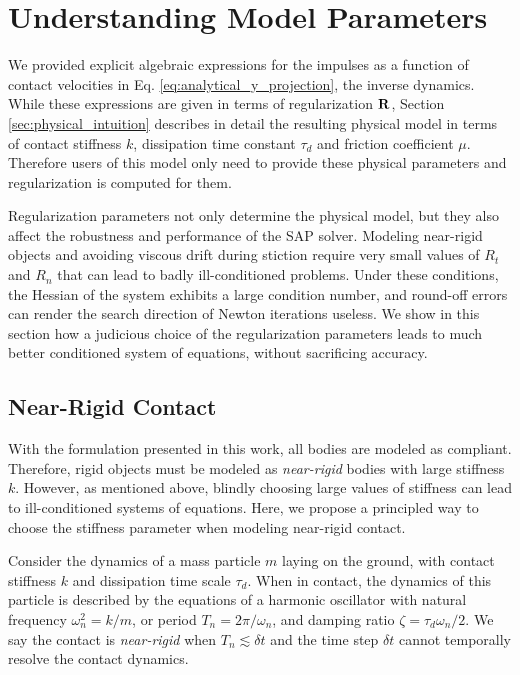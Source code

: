 \section{Understanding Model Parameters}
\label{sec:understanding_model_parameters}

We provided explicit algebraic expressions for the impulses as a function of
contact velocities in Eq. \eqref{eq:analytical_y_projection}, the inverse
dynamics. While these expressions are given in terms of regularization ${\mathbf{R}}$,
Section \ref{sec:physical_intuition} describes in detail the resulting physical
model in terms of contact stiffness $k$, dissipation time constant $\tau_d$ and
friction coefficient $\mu$. Therefore users of this model only need to provide
these physical parameters and regularization is computed for them.

Regularization parameters not only determine the physical model, but
they also affect the robustness and performance of the SAP solver. Modeling near-rigid
objects and avoiding viscous drift during stiction require very small values of
$R_t$ and $R_n$ that can lead to badly ill-conditioned problems. Under these
conditions, the Hessian of the system exhibits a large condition number, and
round-off errors can render the search direction of Newton iterations
useless. We show in this section how a judicious choice of the regularization
parameters leads to much better conditioned system of equations, without
sacrificing accuracy.

\subsection{Near-Rigid Contact}

With the formulation presented in this work, all bodies are modeled as compliant.
Therefore, rigid objects must be modeled as \emph{near-rigid} bodies with large
stiffness $k$. However, as mentioned above, blindly choosing large values of stiffness can
lead to ill-conditioned systems of equations. Here, we propose a principled way
to choose the stiffness parameter when modeling near-rigid contact.

Consider the dynamics of a mass particle $m$ laying on the ground, with contact
stiffness $k$ and dissipation time scale $\tau_d$. When in contact, the dynamics
of this particle is described by the equations of a harmonic oscillator with
natural frequency $\omega_n^2 = k/m$, or period $T_n = 2\pi/\omega_n$, and
damping ratio $\zeta=\tau_d\omega_n/2$. We say the contact is \emph{near-rigid}
when $T_n \lesssim \delta t$ and the time step $\delta t$ cannot temporally
resolve the contact dynamics. 

